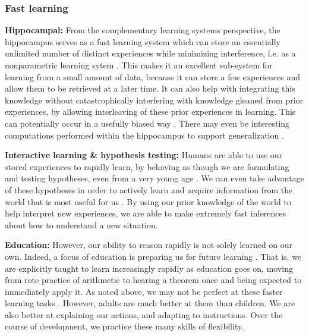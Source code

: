 \documentclass[11pt]{article}
\begin{document}
\subsubsection{Fast learning}
\textbf{Hippocampal:} From the complementary learning systems perspective, the hippocampus serves as a fast learning system which can store an essentially unlimited number of distinct experiences while minimizing interference, i.e. as a nonparametric learning sytem \citep{Kumaran2016}. This makes it an excellent sub-system for learning from a small amount of data, because it can store a few experiences and allow them to be retrieved at a later time. It can also help with integrating this knowledge without catastrophically interfering \citep{McCloskey1989} with knowledge gleaned from prior experiences, by allowing interleaving of these prior experiences in learning. This can potentially occur in a usefully biased way \citep{Kumaran2016}. There may even be interesting computations performed within the hippocampus to support generalization \citep{Kumaran2012}. \par 
\textbf{Interactive learning \& hypothesis testing:} Humans are able to use our stored experiences to rapidly learn, by behaving as though we are formulating and testing hypotheses, even from a very young age \citep{Sobel2004, Gopnik2014}. We can even take advantage of these hypotheses in order to actively learn and acquire information from the world that is most useful for us \citep[e.g.]{Markant2014a}. By using our prior knowledge of the world to help interpret new experiences, we are able to make extremely fast inferences about how to understand a new situation. \par
\textbf{Education:} However, our ability to reason rapidly is not solely learned on our own. Indeed, a focus of education is preparing us for future learning \citep{Bransford1999}. That is, we are explicitly taught to learn increasingly rapidly as education goes on, moving from rote practice of arithmetic to hearing a theorem once and being expected to immediately apply it. As noted above, we may not be perfect at these faster learning tasks \citep[e.g.]{Hazzan1999}. However, adults are much better at them than children. We are also better at explaining our actions, and adapting to instructions. Over the course of development, we practice these many skills of flexibility. \par 
\end{document}
